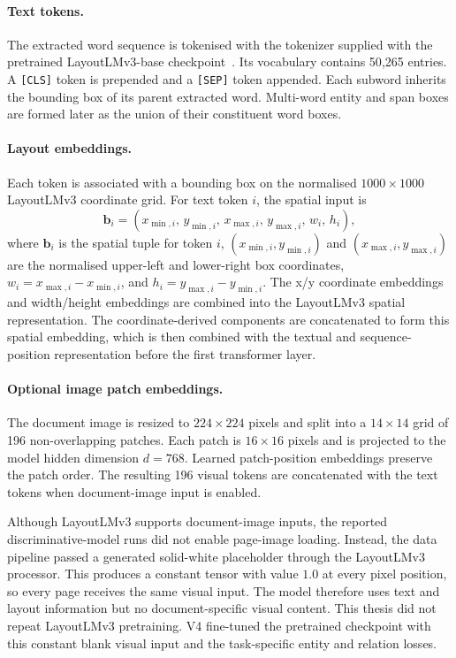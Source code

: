 \paragraph{Text tokens.}
The extracted word sequence is tokenised with the tokenizer supplied with the
pretrained LayoutLMv3-base checkpoint~\cite{layoutlmv3}. Its vocabulary
contains 50{,}265 entries. A \texttt{[CLS]} token is prepended
and a \texttt{[SEP]} token appended. Each subword inherits the bounding box of
its parent extracted word. Multi-word entity and span boxes are formed later as the
union of their constituent word boxes.

\paragraph{Layout embeddings.}
Each token is associated with a bounding box on the normalised
$1000 \times 1000$ LayoutLMv3 coordinate grid. For text token $i$, the spatial
input is
\[
  \mathbf{b}_i =
  (x_{\min,i},\,y_{\min,i},\,x_{\max,i},\,y_{\max,i},\,w_i,\,h_i),
\]
where $\mathbf{b}_i$ is the spatial tuple for token $i$,
$(x_{\min,i},y_{\min,i})$ and $(x_{\max,i},y_{\max,i})$ are the normalised
upper-left and lower-right box coordinates,
$w_i=x_{\max,i}-x_{\min,i}$, and $h_i=y_{\max,i}-y_{\min,i}$. The x/y coordinate embeddings and width/height embeddings are combined into
the LayoutLMv3 spatial representation. The coordinate-derived components are
concatenated to form this spatial embedding, which is then combined with the
textual and sequence-position representation before the first transformer
layer.

\paragraph{Optional image patch embeddings.}
The document image is resized to $224 \times 224$ pixels and split into a
$14 \times 14$ grid of 196 non-overlapping patches. Each patch is
$16 \times 16$ pixels and is projected to the model hidden dimension
$d = 768$. Learned patch-position embeddings preserve the patch order.
The resulting 196 visual tokens are concatenated with the text tokens when
document-image input is enabled.

Although LayoutLMv3 supports document-image inputs, the reported
discriminative-model runs
did not enable page-image loading. Instead, the data pipeline passed a generated
solid-white placeholder through the LayoutLMv3 processor. This produces a
constant tensor with value $1.0$ at every pixel position, so every page receives
the same visual input. The model therefore uses text and layout information but
no document-specific visual content. This thesis did not repeat LayoutLMv3
pretraining. V4 fine-tuned the pretrained checkpoint with this constant blank
visual input and the task-specific entity and relation losses.

